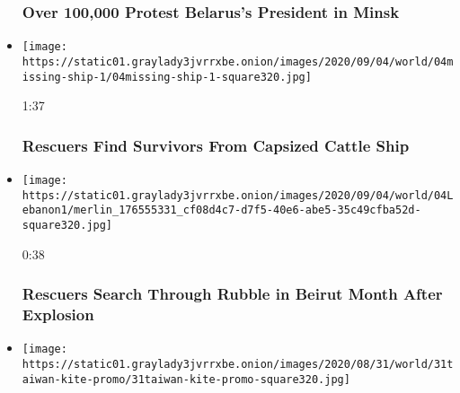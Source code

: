 \begin{itemize}
  \hypertarget{over-100000-protest-belaruss-president-in-minsk}{%
  \subsubsection{Over 100,000 Protest Belarus's President in
  Minsk}\label{over-100000-protest-belaruss-president-in-minsk}}
\item
  \href{https://www.nytimes3xbfgragh.onion/video/world/asia/100000007325058/missing-livestock-ship-rescue.html?action=click\&module=video-series-bar\&region=header\&pgtype=Article\&playlistId=video/world}{}

  \texttt{[image: https://static01.graylady3jvrrxbe.onion/images/2020/09/04/world/04missing-ship-1/04missing-ship-1-square320.jpg]}

  1:37

  \hypertarget{rescuers-find-survivors-from-capsized-cattle-ship}{%
  \subsubsection{Rescuers Find Survivors From Capsized Cattle
  Ship}\label{rescuers-find-survivors-from-capsized-cattle-ship}}
\item
  \href{https://www.nytimes3xbfgragh.onion/video/world/middleeast/100000007325054/beirut-rescue-team-survivor.html?action=click\&module=video-series-bar\&region=header\&pgtype=Article\&playlistId=video/world}{}

  \texttt{[image: https://static01.graylady3jvrrxbe.onion/images/2020/09/04/world/04Lebanon1/merlin\_176555331\_cf08d4c7-d7f5-40e6-abe5-35c49cfba52d-square320.jpg]}

  0:38

  \hypertarget{rescuers-search-through-rubble-in-beirut-month-after-explosion}{%
  \subsubsection{Rescuers Search Through Rubble in Beirut Month After
  Explosion}\label{rescuers-search-through-rubble-in-beirut-month-after-explosion}}
\item
  \href{https://www.nytimes3xbfgragh.onion/video/world/asia/100000007316365/taiwan-kite-video.html?action=click\&module=video-series-bar\&region=header\&pgtype=Article\&playlistId=video/world}{}

  \texttt{[image: https://static01.graylady3jvrrxbe.onion/images/2020/08/31/world/31taiwan-kite-promo/31taiwan-kite-promo-square320.jpg]}


\end{itemize}
